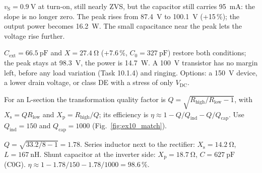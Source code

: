 
\begin{solutionblock}
	$v_\mathrm{S}=\SI{0.9}{\volt}$ at turn-on, still nearly ZVS, but the capacitor still carries \SI{95}{\milli\ampere}: the slope is no longer zero. The peak rises from \SI{87.4}{\volt} to \SI{100.1}{\volt} (+15\,\%); the output power becomes \SI{16.2}{\watt}. The small capacitance near the peak lets the voltage rise further.
\end{solutionblock}


\begin{solutionblock}
	$C_\mathrm{ext}=\SI{66.5}{\pico\farad}$ and $X=\SI{27.4}{\ohm}$ (+7.6\,\%, $C_0=\SI{327}{\pico\farad}$) restore both conditions; the peak stays at \SI{98.3}{\volt}, the power is \SI{14.7}{\watt}. A \SI{100}{\volt} transistor has no margin left, before any load variation (Task 10.1.4) and ringing. Options: a \SI{150}{\volt} device, a lower drain voltage, or class DE with a stress of only $V_\mathrm{DC}$.
\end{solutionblock}



For an L-section the transformation quality factor is $Q=\sqrt{R_\mathrm{high}/R_\mathrm{low}-1}$, with $X_\mathrm{s}=QR_\mathrm{low}$ and $X_\mathrm{p}=R_\mathrm{high}/Q$; its efficiency is $\eta\approx1-Q/Q_\mathrm{ind}-Q/Q_\mathrm{cap}$. Use $Q_\mathrm{ind}=150$ and $Q_\mathrm{cap}=1000$ (Fig.~\ref{fig:ex10_match}).




\begin{solutionblock}
	$Q=\sqrt{33.2/8-1}=1.78$. Series inductor next to the rectifier: $X_\mathrm{s}=\SI{14.2}{\ohm}$, $L=\SI{167}{\nano\henry}$. Shunt capacitor at the inverter side: $X_\mathrm{p}=\SI{18.7}{\ohm}$, $C=\SI{627}{\pico\farad}$ (C0G). $\eta\approx1-1.78/150-1.78/1000=98.6\,\%$.
\end{solutionblock}

